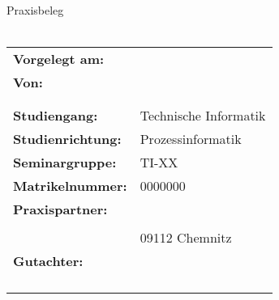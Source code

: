 \begin{titlepage}
	\begin{bfseries}
		\begin{center}
			\Huge{Praxisbeleg}\\[1cm]
			\Large{\dctitle}\\[2cm]
		\end{center}
	\end{bfseries}
			\begin{tabular}{p{}l}							%
				\textbf{Vorgelegt am:} & \dcdate\\[0.8cm]
				\textbf{Von:} & \textbf{\dcauthorfirstname~\dcauthorlastname}\\  
				& \dcstreet\\
				& \dcplace\\[0.8cm]
				
				\textbf{Studiengang:} & Technische Informatik\\[0.8cm]
				
				\textbf{Studienrichtung:} & Prozessinformatik\\[0.8cm]
				
				\textbf{Seminargruppe:} & TI-XX\\[0.8cm]
				
				\textbf{Matrikelnummer:} & 0000000\\[0.8cm]
				
				\textbf{Praxispartner:} & \dccompany\\
				& \dccompanyadr\\
				& 09112 Chemnitz\\[0.4cm]
				
				\textbf{Gutachter:} &  \\
				& \dccompany \\\\
				& \\
				& \dcuni\\
			\end{tabular}
\end{titlepage}

